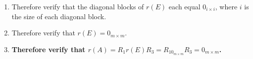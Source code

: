 \documentclass[twocolumn]{article}
\begin{document}
\begin{enumerate}
\begin{enumerate}
					\item Let $0_{m\times n}$ denote an $m\times n$ matrix of zeros.
					\item Therefore, for $i=1$ up to $i=k$: Cognizant of the construction of $G$'s last column, verify that $p(G)e_i=(G^k+p_1G^{k-1}+p_2G^{k-2}+\cdots+p_kG^0)e_i=(G^k+p_1G^{k-1}+p_2G^{k-2}+\cdots+p_kG^0)G^{i-1}e_1=G^{i-1}(GG^{k-1}+p_1G^{k-1}+p_2G^{k-2}+\cdots+p_kG^0)e_1=G^{i-1}(Ge_k+p_1e_k+p_2e_{k-1}+\cdots+p_ke_1)=G^{i-1}0_{k\times 1}=0_{k\times 1}$.
					\item Therefore verify that $p(G)=0_{k\times k}$.
					\item Cognizant of the execution of \hyperref[sec:algorithm 3]{algorithm 3} in (1), verify that $r=B_{m,m}=B_{j,j}u_{j+1}u_{j+2}\cdots u_m=B_{j,j}q=pq$, where $q=u_{j+1}u_{j+2}\cdots u_m$.
					\item Therefore verify that $r(G)=p(G)q(G)=0_{k\times k}q(G)=0_{k\times k}$.
				\end{enumerate}
				\item Therefore verify that the diagonal blocks of $r(E)$ each equal $0_{i\times i}$, where $i$ is the size of each diagonal block.
				\item Therefore verify that $r(E)=0_{m\times m}$.
				\item \textbf{Therefore verify that $r(A)=R_1r(E)R_3=R_10_{m\times m}R_3=0_{m\times m}$.}
			\end{enumerate}
\end{document}
